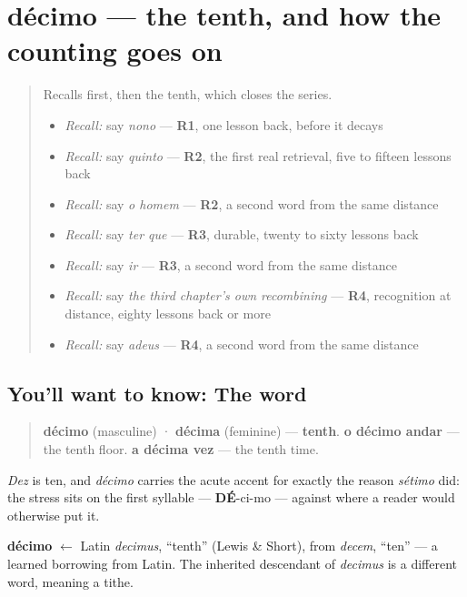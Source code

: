 \section[décimo / décima]{décimo — the tenth, and how the counting goes on}

\label{lesson:PT-C28-decimo}



\begin{quote}
Recalls first, then the tenth, which closes the series.

\begin{itemize}
\raggedright
  \item \emph{Recall:} say \emph{nono} — \textbf{R1}, one lesson back, before it decays
  \item \emph{Recall:} say \emph{quinto} — \textbf{R2}, the first real retrieval, five to fifteen lessons back
  \item \emph{Recall:} say \emph{o homem} — \textbf{R2}, a second word from the same distance
  \item \emph{Recall:} say \emph{ter que} — \textbf{R3}, durable, twenty to sixty lessons back
  \item \emph{Recall:} say \emph{ir} — \textbf{R3}, a second word from the same distance
  \item \emph{Recall:} say \emph{the third chapter's own recombining} — \textbf{R4}, recognition at distance, eighty lessons back or more
  \item \emph{Recall:} say \emph{adeus} — \textbf{R4}, a second word from the same distance
\end{itemize}
\end{quote}

\subsection*{You'll want to know: The word}
\begin{quote}
\textbf{décimo} (masculine) · \textbf{décima} (feminine) — \textbf{tenth}. \textbf{o décimo andar} — the tenth floor. \textbf{a décima vez} — the tenth time.
\end{quote}

\emph{Dez} is ten, and \emph{décimo} carries the acute accent for exactly the reason \emph{sétimo} did: the stress sits on the first syllable — \textbf{DÉ}-ci-mo — against where a reader would otherwise put it.

\begin{cousinweb}
\textbf{décimo} $\leftarrow$ Latin \emph{decimus}, \textquotedblleft{}tenth\textquotedblright{} (Lewis \& Short), from \emph{decem}, \textquotedblleft{}ten\textquotedblright{} — a learned borrowing from Latin. The inherited descendant of \emph{decimus} is a different word, meaning a tithe.
\end{cousinweb}

